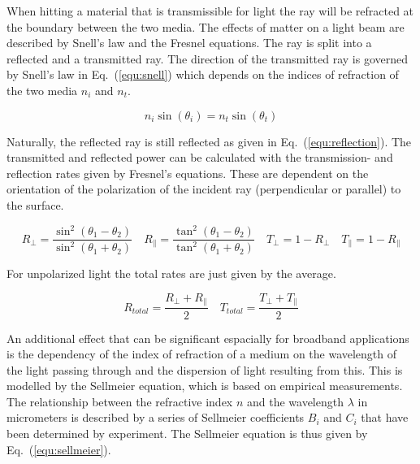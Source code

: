 \documentclass[a4paper,10pt]{article}
\newcommand{\equref}[1]{Eq.~(\ref{#1})}
\begin{document}
    When hitting a material that is transmissible for light the ray
    will be refracted at the boundary between the two media.
    The effects of matter on a light beam are described by Snell's law
    and the Fresnel equations.
    The ray is split into a reflected and a transmitted ray.
    The direction of the transmitted ray is governed by Snell's law in \equref{equ:snell}
    which depends on the indices of refraction of the two media $n_i$ and $n_t$.

    \begin{equation}
        \label{equ:snell}
        n_i \sin(\theta_i) = n_t \sin(\theta_t)
    \end{equation}

    Naturally, the reflected ray is still reflected as given in
    \equref{equ:reflection}.
    The transmitted and reflected power can be calculated with the transmission- and
    reflection rates given by Fresnel's equations.
    These are dependent on the orientation of the polarization of the incident ray
    (perpendicular or parallel) to the surface.

    \begin{equation}
        \label{equ:fresnel}
		R_{\perp} = \frac{\sin^2(\theta_1 - \theta_2)}{\sin^2(\theta_1 + \theta_2)} \quad
		R_{\parallel} = \frac{\tan^2(\theta_1 - \theta_2)}{\tan^2(\theta_1 + \theta_2)} \quad
		T_{\perp} = 1 - R_{\perp} \quad
		T_{\parallel} = 1 - R_{\parallel}
    \end{equation}

    For unpolarized light the total rates are just given by the average.
    
    \begin{equation}
        \label{equ:fresnel_unpolarized}
		R_{total} = \frac{R_{\perp} + R_{\parallel}}{2} \quad
		T_{total} = \frac{T_{\perp} + T_{\parallel}}{2}
    \end{equation}
    
    An additional effect that can be significant espacially for broadband
    applications is the dependency of the index of refraction of a medium
    on the wavelength of the light passing through and the dispersion
    of light resulting from this.
    This is modelled by the Sellmeier equation, which is based on 
    empirical measurements.
    The relationship between the refractive index $n$ and the wavelength 
    $\lambda$ in micrometers is described by a series of Sellmeier coefficients $B_i$ and
    $C_i$ that have been determined by experiment.
    The Sellmeier equation is thus given by \equref{equ:sellmeier}.
\end{document}

